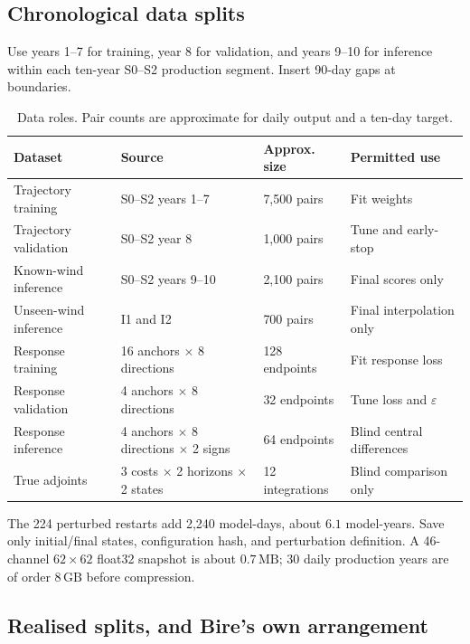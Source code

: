 \documentclass[11pt]{article}
\begin{document}
\subsection{Chronological data splits}
Use years 1--7 for training, year 8 for validation, and years 9--10 for inference within
each ten-year S0--S2 production segment. Insert 90-day gaps at boundaries.

\begin{table}[htbp]\centering\small
\caption{Data roles. Pair counts are approximate for daily output and a ten-day target.}
\label{tab:splits}
\begin{tabularx}{\textwidth}{@{}p{}p{}p{}Y@{}}
\toprule
\textbf{Dataset} & \textbf{Source} & \textbf{Approx. size} & \textbf{Permitted use} \\
\midrule
Trajectory training & S0--S2 years 1--7 & 7,500 pairs & Fit weights \\
Trajectory validation & S0--S2 year 8 & 1,000 pairs & Tune and early-stop \\
Known-wind inference & S0--S2 years 9--10 & 2,100 pairs & Final scores only \\
Unseen-wind inference & I1 and I2 & 700 pairs & Final interpolation only \\
Response training & 16 anchors \(\times\) 8 directions & 128 endpoints & Fit response loss \\
Response validation & 4 anchors \(\times\) 8 directions & 32 endpoints & Tune loss and \(\varepsilon\) \\
Response inference & 4 anchors \(\times\) 8 directions \(\times\) 2 signs & 64 endpoints & Blind central differences \\
True adjoints & 3 costs \(\times\) 2 horizons \(\times\) 2 states & 12 integrations & Blind comparison only \\
\bottomrule
\end{tabularx}
\end{table}

The 224 perturbed restarts add 2,240 model-days, about \(6.1\) model-years. Save only
initial/final states, configuration hash, and perturbation definition. A 46-channel
\(62\times62\) float32 snapshot is about \(0.7\,\mathrm{MB}\); 30 daily production years are of
order \(8\,\mathrm{GB}\) before compression.

\subsection{Realised splits, and Bire's own arrangement}
\end{document}

